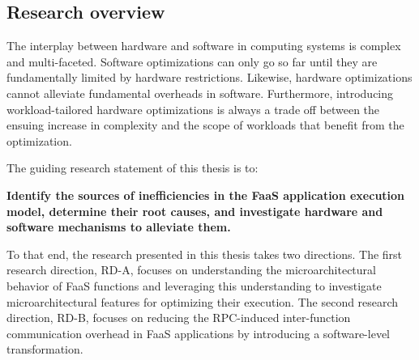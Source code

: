 \documentclass[../main.tex]{subfiles}
\begin{document}
\begin{refsection}[main-bib]


\section{Research overview}
The interplay between hardware and software in computing systems is
complex and multi-faceted. Software optimizations can only go so far
until they are fundamentally limited by hardware
restrictions. Likewise, hardware optimizations cannot alleviate
fundamental overheads in software. Furthermore, introducing
workload-tailored hardware optimizations is always a trade off between
the ensuing increase in complexity and the scope of workloads that
benefit from the optimization.

The guiding research statement of this thesis is to:
\begin{framed}
\noindent
\textbf{Identify the sources of inefficiencies in the FaaS application execution model, determine their root causes, and investigate hardware and software mechanisms to alleviate them.}
\end{framed}
\noindent
To that end, the research presented in this thesis takes two
directions. The first research direction, RD-A, focuses on
understanding the microarchitectural behavior of FaaS functions and
leveraging this understanding to investigate microarchitectural
features for optimizing their execution.
The second research direction, RD-B, focuses on reducing the
RPC-induced inter-function communication overhead in FaaS applications by
introducing a software-level transformation.



\end{refsection}
\end{document}

